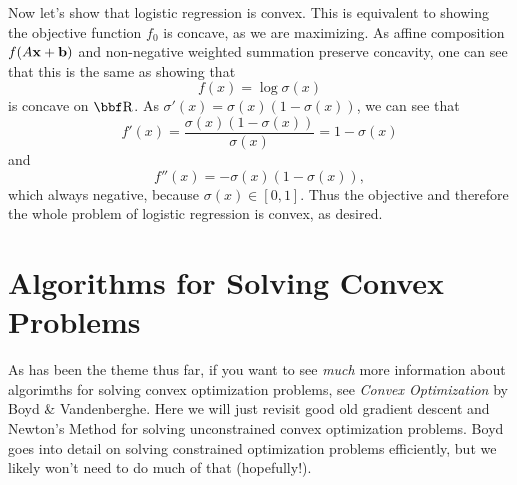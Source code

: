 \documentclass{article}
\begin{document}
Now let's show that logistic regression is convex. This is equivalent to showing
the objective function $f_0$ is concave, as we are maximizing. As affine composition
$f(A{\bf x}+{\bf b})$ and non-negative weighted summation preserve concavity, one can
see that this is the same as showing that
\[
    f(x) = \log\sigma(x)
\]
is concave on $\RR$. As $\sigma'(x)=\sigma(x)(1-\sigma(x))$, we can see that
\[
    f'(x) = \frac{\sigma(x)(1-\sigma(x))}{\sigma(x)} = 1-\sigma(x)
\]
and
\[
    f''(x) = -\sigma(x)(1-\sigma(x)),
\]
which always negative, because $\sigma(x)\in[0,1]$. Thus the objective and
therefore the whole problem of logistic regression is convex, as desired.

\section{Algorithms for Solving Convex Problems}

As has been the theme thus far, if you want to see \textit{much} more information
about algorimths for solving convex optimization problems, see \textit{Convex Optimization}
by Boyd \& Vandenberghe. Here we will just revisit good old gradient descent
and Newton's Method for solving unconstrained convex optimization problems.
Boyd goes into detail on solving constrained optimization problems efficiently,
but we likely won't need to do much of that (hopefully!).
\end{document}
